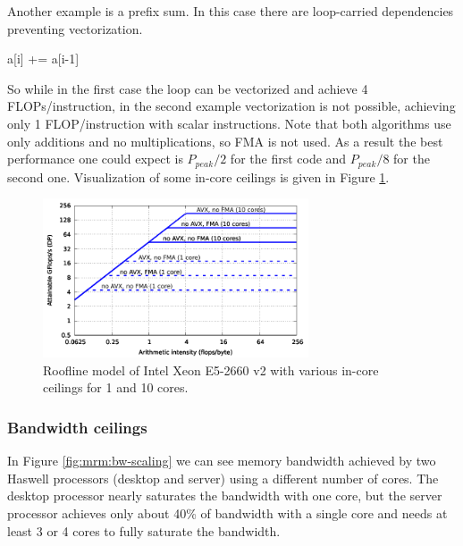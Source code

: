 Another example is a prefix sum.
In this case there are loop-carried dependencies preventing vectorization.
\begin{algorithmic}[1]
      \State a[i] += a[i-1]
  \EndFor
\end{algorithmic}%

So while in the first case the loop can be vectorized and achieve 4 FLOPs/instruction, in the second example vectorization is not possible, achieving only 1 FLOP/instruction with scalar instructions.
Note that both algorithms use only additions and no multiplications, so FMA is not used. As a result the best performance one could expect is $P_{peak}/2$ for the first code and $P_{peak}/8$ for the second one.
Visualization of some in-core ceilings is given in Figure \ref{fig:roofline_emmy_core-ceilings}.

\begin{figure}[ht]
   \centering
   \includegraphics[width=0.7\textwidth,clip=true]{images/roofline/roofline_emmy_Xeon2660v2_core-ceilings.pdf}
   \caption{Roofline model of Intel Xeon E5-2660 v2 with various in-core ceilings for 1 and 10 cores.}
  \label{fig:roofline_emmy_core-ceilings}
\end{figure}

\subsubsection*{Bandwidth ceilings}


In Figure \ref{fig:mrm:bw-scaling} we can see memory bandwidth achieved by two Haswell processors (desktop and server) using a different number of cores. The desktop processor nearly saturates the bandwidth with one core, but the server processor achieves only about 40\% of bandwidth with a single core and needs at least 3 or 4 cores to fully saturate the bandwidth.

